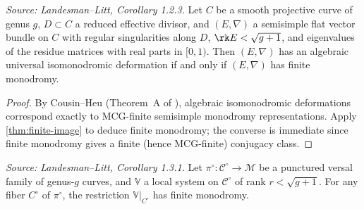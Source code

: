 \begin{corollary}
  \label{cor:isomonodromy}
  \textit{Source: Landesman--Litt, Corollary 1.2.3.}
  Let $C$ be a smooth projective curve of genus $g$, $D \subset C$ a reduced
  effective divisor, and $(E,\nabla)$ a semisimple flat vector bundle on $C$
  with regular singularities along $D$, $\rk E < \sqrt{g+1}$, and eigenvalues
  of the residue matrices with real parts in $[0,1)$.
  Then $(E,\nabla)$ has an algebraic universal isomonodromic deformation if
  and only if $(E,\nabla)$ has finite monodromy.
\end{corollary}

\begin{proof}
  By Cousin--Heu (Theorem~A of \cite{CH:isomonodromic}), algebraic
  isomonodromic deformations correspond exactly to MCG-finite semisimple
  monodromy representations.
  Apply \cref{thm:finite-image} to deduce finite monodromy; the converse is
  immediate since finite monodromy gives a finite (hence MCG-finite) conjugacy
  class.
\end{proof}

\begin{corollary}
  \label{cor:versal-families}
  \textit{Source: Landesman--Litt, Corollary 1.3.1.}
  Let $\pi^\circ\colon \mathcal{C}^\circ \to \mathcal{M}$ be a punctured versal
  family of genus-$g$ curves, and $\mathbb{V}$ a local system on
  $\mathcal{C}^\circ$ of rank $r < \sqrt{g+1}$.
  For any fiber $C^\circ$ of $\pi^\circ$, the restriction $\mathbb{V}|_{C^\circ}$
  has finite monodromy.
\end{corollary}

